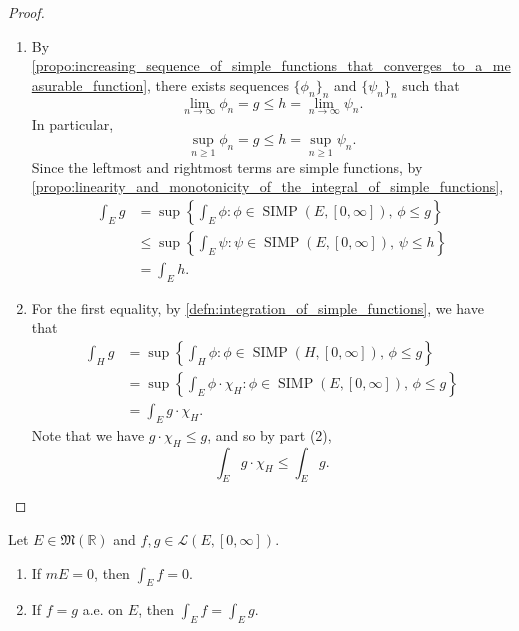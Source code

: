\documentclass[notoc,notitlepage]{tufte-book}
\DeclareMathOperator{\SIMP}{SIMP}
\begin{document}
\begin{proof}
\begin{enumerate}
    \item By
      \cref{propo:increasing_sequence_of_simple_functions_that_converges_to_a_measurable_function},
      there exists sequences $\{ \phi_n \}_n$ and $\{ \psi_n \}_n$ such that
      \begin{equation*}
        \lim_{n \to \infty} \phi_n = g \leq h = \lim_{n \to \infty} \psi_n.
      \end{equation*}
      In particular,
      \begin{equation*}
        \sup_{n \geq 1} \phi_n = g \leq h = \sup_{n \geq 1} \psi_n.
      \end{equation*}
      Since the leftmost and rightmost terms are simple functions, by
      \cref{propo:linearity_and_monotonicity_of_the_integral_of_simple_functions},
      \begin{align*}
        \int_{E} g
        &= \sup \left\{ \int_{E} \phi : \phi \in \SIMP(E, [0, \infty]),\, \phi
          \leq g \right\} \\
        &\leq \sup \left\{ \int_{E} \psi : \psi \in \SIMP(E, [0, \infty]),\,
          \psi \leq h \right\} \\
        &= \int_{E} h.
      \end{align*}

    \item {} For the first equality, by
      \cref{defn:integration_of_simple_functions}, we have that
      \begin{align*}
        \int_{H} g
        &= \sup \left\{ \int_{H} \phi : \phi \in \SIMP(H, [0, \infty]),\, \phi
          \leq g \right\} \\
        &= \sup \left\{ \int_{E} \phi \cdot \chi_H : \phi \in \SIMP(E, [0,
          \infty]),\, \phi \leq g \right\}  \\
        &= \int_{E} g \cdot \chi_H.
      \end{align*}
      Note that we have $g \cdot \chi_H \leq g$, and so by part (2),
      \begin{equation*}
        \int_{E} g \cdot \chi_H \leq \int_{E} g.
      \end{equation*}
  \end{enumerate}
\end{proof}

\begin{propo}\label{propo:integration_over_domains_of_measure_zero_and_integration_of_functions_agreeing_almost_everywhere}
  Let $E \in \mathfrak{M}(\mathbb{R})$ and $f, g \in \mathcal{L}(E, [0,
  \infty])$.
  \begin{enumerate}
    \item If $mE = 0$, then $\int_{E} f = 0$.
    \item If $f = g$ a.e. on $E$, then $\int_{E} f = \int_{E} g$.
  \end{enumerate}
\end{propo}
\end{document}
